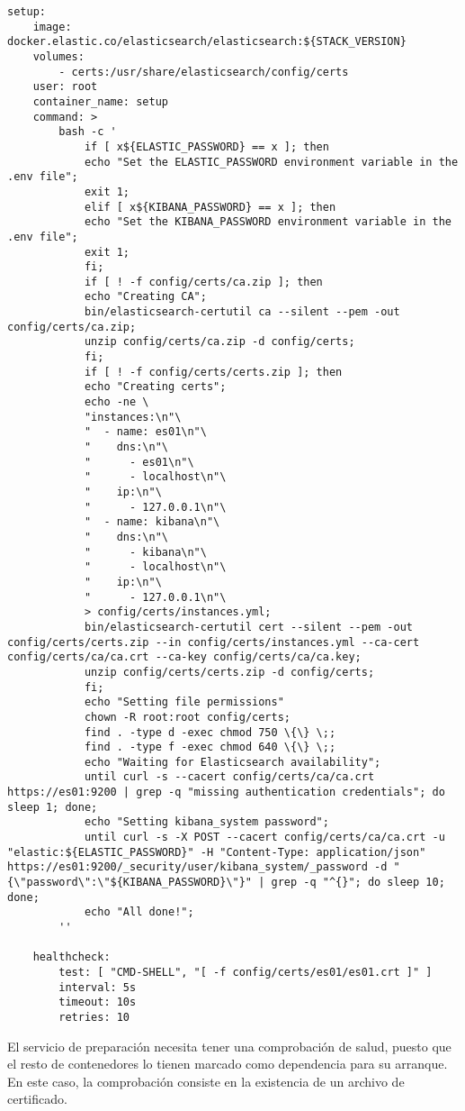 \begin{lstlisting}[style=yaml, caption={Definición del servicio de preparación}]
setup:
	image: docker.elastic.co/elasticsearch/elasticsearch:${STACK_VERSION}
	volumes:
		- certs:/usr/share/elasticsearch/config/certs
	user: root
	container_name: setup
	command: >
		bash -c '
			if [ x${ELASTIC_PASSWORD} == x ]; then
			echo "Set the ELASTIC_PASSWORD environment variable in the .env file";
			exit 1;
			elif [ x${KIBANA_PASSWORD} == x ]; then
			echo "Set the KIBANA_PASSWORD environment variable in the .env file";
			exit 1;
			fi;
			if [ ! -f config/certs/ca.zip ]; then
			echo "Creating CA";
			bin/elasticsearch-certutil ca --silent --pem -out config/certs/ca.zip;
			unzip config/certs/ca.zip -d config/certs;
			fi;
			if [ ! -f config/certs/certs.zip ]; then
			echo "Creating certs";
			echo -ne \
			"instances:\n"\
			"  - name: es01\n"\
			"    dns:\n"\
			"      - es01\n"\
			"      - localhost\n"\
			"    ip:\n"\
			"      - 127.0.0.1\n"\
			"  - name: kibana\n"\
			"    dns:\n"\
			"      - kibana\n"\
			"      - localhost\n"\
			"    ip:\n"\
			"      - 127.0.0.1\n"\
			> config/certs/instances.yml;
			bin/elasticsearch-certutil cert --silent --pem -out config/certs/certs.zip --in config/certs/instances.yml --ca-cert config/certs/ca/ca.crt --ca-key config/certs/ca/ca.key;
			unzip config/certs/certs.zip -d config/certs;
			fi;
			echo "Setting file permissions"
			chown -R root:root config/certs;
			find . -type d -exec chmod 750 \{\} \;;
			find . -type f -exec chmod 640 \{\} \;;
			echo "Waiting for Elasticsearch availability";
			until curl -s --cacert config/certs/ca/ca.crt https://es01:9200 | grep -q "missing authentication credentials"; do sleep 1; done;
			echo "Setting kibana_system password";
			until curl -s -X POST --cacert config/certs/ca/ca.crt -u "elastic:${ELASTIC_PASSWORD}" -H "Content-Type: application/json" https://es01:9200/_security/user/kibana_system/_password -d "{\"password\":\"${KIBANA_PASSWORD}\"}" | grep -q "^{}"; do sleep 10; done;
			echo "All done!";
		''

	healthcheck:
		test: [ "CMD-SHELL", "[ -f config/certs/es01/es01.crt ]" ]
		interval: 5s
		timeout: 10s
		retries: 10
\end{lstlisting}

El servicio de preparación necesita tener una comprobación de salud, puesto que
el resto de contenedores lo tienen marcado como dependencia para su arranque. En
este caso, la comprobación consiste en la existencia de un archivo de
certificado.

